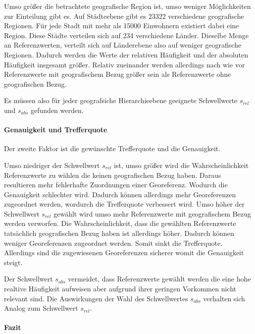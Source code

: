 				Umso größer die betrachtete geografische Region ist, umso weniger Möglichkeiten zur Einteilung gibt es.
				Auf Städteebene gibt es 23322 verschiedene geografische Regionen. 
				Für jede Stadt mit mehr als 15000 Einwohnern existiert dabei eine Region.
				Diese Städte verteilen sich auf 234 verschiedene Länder.
				Dieselbe Menge an Referenzwerten, verteilt sich auf Länderebene also auf weniger geografische Regionen. 
				Dadurch werden die Werte der relativen Häufigkeit und der absoluten Häufigkeit insgesamt größer.
				Relativ zueinander werden allerdings nach wie vor Referenzwerte mit geografischem Bezug größer sein als Referenzwerte ohne geografischen Bezug.

				Es müssen also für jeder geografsiche Hierarchieebene geeignete Schwellwerte $s_{rel}$ und $s_{abs}$ gefunden werden.

			\paragraph{Genauigkeit und Trefferquote} 

				Der zweite Faktor ist die gewünschte Trefferquote und die Genauigkeit.

				Umso niedriger der Schwellwert $s_{rel}$ ist, umso größer wird die Wahrscheinlichkeit Referenzwerte zu wählen die keinen geografischen Bezug haben.
				Daraus resultieren mehr fehlerhafte Zuordnungen einer Georeferenz.
				Wodurch die Genauigkeit schlechter wird.
				Dadurch können allerdings mehr Georeferenzen zugeordnet werden, wordurch die Trefferquote verbessert wird.
				Umso höher der Schwellwert $s_{rel}$ gewählt wird umso mehr Referenzwerte mit geografischem Bezug werden verworfen.
				Die Wahrscheinlichkeit, dass die gewählten Referenzwerte tatsächlich geografischen Bezug haben ist allerdings höher.
				Dadurch können weniger Georeferenzen zugeordnet werden.
				Somit sinkt die Trefferquote.
				Allerdings sind die zugewiesenen Georeferenzen sicherer womit die Genauigkeit steigt.

				Der Schwellwert $s_{abs}$ vermeidet, dass Referenzwerte gewählt werden die eine hohe realtive Häufigkeit aufweisen aber aufgrund ihrer geringen Vorkommen nicht relevant sind.
				Die Auswirkungen der Wahl des Schwellwertes $s_{abs}$ verhalten sich Analog zum Schwellwert $s_{rel}$.

			\paragraph{Fazit}

